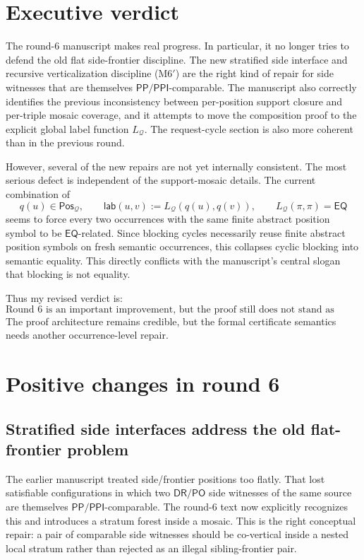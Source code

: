 \documentclass[11pt]{article}
\newcommand{\EQ}{\mathsf{EQ}}
\newcommand{\DR}{\mathsf{DR}}
\newcommand{\PO}{\mathsf{PO}}
\newcommand{\PP}{\mathsf{PP}}
\newcommand{\PPI}{\mathsf{PPI}}
\newcommand{\Q}{\mathcal Q}
\newcommand{\Pos}{\mathsf{Pos}}
\newcommand{\lab}{\mathsf{lab}}
\begin{document}
\section{Executive verdict}

The round-6 manuscript makes real progress.  In particular, it no longer tries
to defend the old flat side-frontier discipline.  The new stratified side
interface and recursive verticalization discipline (M6$'$) are the right kind
of repair for side witnesses that are themselves $\PP/\PPI$-comparable.  The
manuscript also correctly identifies the previous inconsistency between
per-position support closure and per-triple mosaic coverage, and it attempts to
move the composition proof to the explicit global label function $L_{\Q}$.  The
request-cycle section is also more coherent than in the previous round.

However, several of the new repairs are not yet internally consistent.  The
most serious defect is independent of the support-mosaic details.  The current
combination of
\[
   q(u)\in\Pos_{\Q},\qquad
   \lab(u,v):=L_{\Q}(q(u),q(v)),\qquad
   L_{\Q}(\pi,\pi)=\EQ
\]
seems to force every two occurrences with the same finite abstract position
symbol to be $\EQ$-related.  Since blocking cycles necessarily reuse finite
abstract position symbols on fresh semantic occurrences, this collapses cyclic
blocking into semantic equality.  This directly conflicts with the manuscript's
central slogan that blocking is not equality.

Thus my revised verdict is:
\[
\boxed{\text{Round 6 is an important improvement, but the proof still does not stand as written.}}
\]
The proof architecture remains credible, but the formal certificate semantics
needs another occurrence-level repair.

\section{Positive changes in round 6}

\subsection{Stratified side interfaces address the old flat-frontier problem}

The earlier manuscript treated side/frontier positions too flatly.  That lost
satisfiable configurations in which two $\DR/\PO$ side witnesses of the same
source are themselves $\PP/\PPI$-comparable.  The round-6 text now explicitly
recognizes this and introduces a stratum forest inside a mosaic.  This is the
right conceptual repair: a pair of comparable side witnesses should be
co-vertical inside a nested local stratum rather than rejected as an illegal
sibling-frontier pair.
\end{document}

